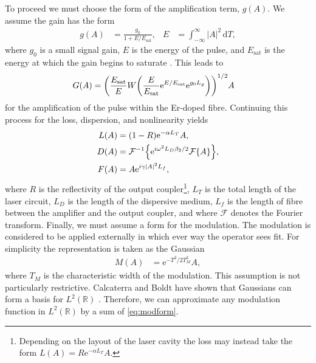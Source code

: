 \documentclass[10pt,twocolumn,a4paper]{article}
\let\originalleft\left
\let\originalright\right
\renewcommand{\left}{\mathopen{}\mathclose\bgroup\originalleft}
\renewcommand{\right}{\aftergroup\egroup\originalright}
\providecommand{\df}{\textrm{d}}
\newcommand{\Es}{E_{\textrm{sat}}}
\newcommand{\FT}[1]{\mathcal{F}\left\{ #1 \right\}}
\newcommand{\FTi}[1]{\mathcal{F}^{-1}\left\{ #1 \right\}}
\begin{document}
To proceed we must choose the form of the amplification term, $g(A)$. We assume the gain has the form
\begin{align}
	g(A) &= \frac{g_0}{1 + E / \Es},& E &= \int_{-\infty}^\infty |A|^2 \, \df T,
	\label{eq:energy}
\end{align}
where $g_0$ is a small signal gain, $E$ is the energy of the pulse, and $\Es$ is the energy at which the gain begins to saturate \cite{bohun2015, burgoyne2014, haus1975, haus1984, haus1992, haus2000, haus1991, kartner2005, peng2018, shtyrina2017, silfvast2004, usechak2005, yarutkina2013}. This leads to
\begin{align}
	G(A) &= \left( \frac{\Es}{E} W \left( \frac{E}{\Es} \textrm{e}^{E/\Es} \textrm{e}^{g_0 L_g} \right) \right)^{1/2} A
\end{align}
for the amplification of the pulse within the Er-doped fibre. Continuing this process for the loss, dispersion, and nonlinearity yields
\begin{align}
	L(A) &= (1 - R) \textrm{e}^{- \alpha L_T}A, \\
	D(A) &= \FTi{\textrm{e}^{i \omega^2 L_D\beta_2/2} \FT{A}}, \\
	F(A) &= A \textrm{e}^{i \gamma |A|^2 L_f},
\end{align}
where $R$ is the reflectivity of the output coupler\footnote{Depending on the layout of the laser cavity the loss may instead take the form $L(A) = R \textrm{e}^{- \alpha L_T}A$.}, $L_T$ is the total length of the laser circuit, $L_D$ is the length of the dispersive medium, $L_f$ is the length of fibre between the amplifier and the output coupler, and where $\mathcal{F}$ denotes the Fourier transform. Finally, we must assume a form for the modulation. The modulation is considered to be applied externally in which ever way the operator sees fit. For simplicity the representation is taken as the Gaussian
\begin{align}
	M(A) &= \textrm{e}^{-T^2 / 2 T_M^2} A,
	\label{eq:modform}
\end{align}
where $T_M$ is the characteristic width of the modulation. This assumption is not particularly restrictive. Calcaterra and Boldt have shown that Gaussians can form a basis for $L^2(\mathbb{R})$ \cite{calcaterra2008a}. Therefore, we can approximate any modulation function in $L^2(\mathbb{R})$ by a sum of \eqref{eq:modform}.
\end{document}
